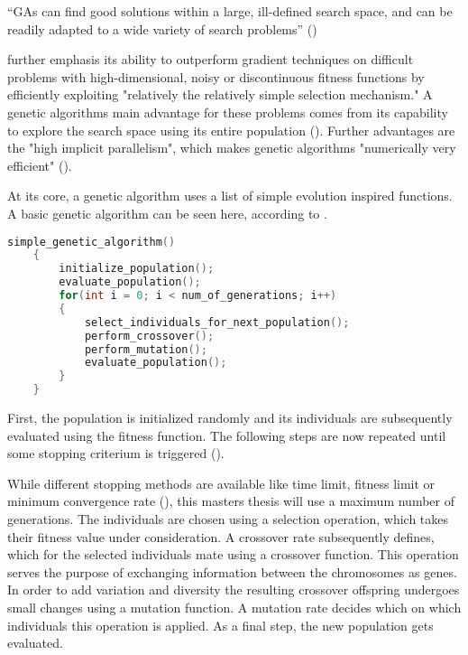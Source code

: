 \enquote{GAs can find good solutions within a large, ill-defined search space, and can be readily adapted to a wide variety of search problems} (\cite{mills_determining_2015})

\cite{grefenstette_optimization_1986} further emphasis its ability to outperform gradient techniques on difficult problems with high-dimensional, noisy or discontinuous fitness functions by efficiently exploiting "relatively the relatively simple selection mechanism." A genetic algorithms main advantage for these problems comes from its capability to explore the search space using its entire population (\cite{hussain_trade-off_2020}). Further advantages are the "high implicit parallelism", which makes genetic algorithms "numerically very efficient" (\cite{marsili_libelli_adaptive_2000}).

At its core, a genetic algorithm uses a list of simple evolution inspired functions. A basic genetic algorithm can be seen here, according to \cite{srinivas_genetic_1994}. 

\begin{lstlisting}[language=C, tabsize=4]
	simple_genetic_algorithm() 
	{
		initialize_population();
		evaluate_population();
		for(int i = 0; i < num_of_generations; i++) 
		{
			select_individuals_for_next_population();
			perform_crossover();
			perform_mutation();
			evaluate_population();
		}
	}
\end{lstlisting}


First, the population is initialized randomly and its individuals are subsequently evaluated using the fitness function. The following steps are now repeated until some stopping criterium is triggered (\cite{grefenstette_optimization_1986}). 

While different stopping methods are available like time limit, fitness limit or minimum convergence rate (\cite{majumdar_genetic_2015}), this masters thesis will use a maximum number of generations.
The individuals are chosen using a selection operation, which takes their fitness value under consideration. A crossover rate subsequently defines, which for the selected individuals mate using a crossover function. This operation serves the purpose of exchanging information between the chromosomes as genes. In order to add variation and diversity the resulting crossover offspring undergoes small changes using a mutation function. A mutation rate decides which on which individuals this operation is applied.
As a final step, the new population gets evaluated.



